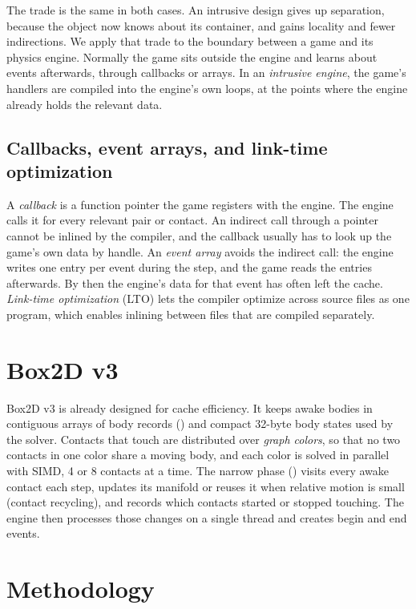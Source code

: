 \documentclass[11pt]{article}
\newcommand{\code}[1]{\texttt{\detokenize{#1}}}
\begin{document}
The trade is the same in both cases. An intrusive design gives up separation, because the object
now knows about its container, and gains locality and fewer indirections. We apply that trade to
the boundary between a game and its physics engine. Normally the game sits outside the engine and
learns about events afterwards, through callbacks or arrays. In an \emph{intrusive engine}, the
game's handlers are compiled into the engine's own loops, at the points where the engine already
holds the relevant data.

\subsection{Callbacks, event arrays, and link-time optimization}

A \emph{callback} is a function pointer the game registers with the engine. The engine calls it
for every relevant pair or contact. An indirect call through a pointer cannot be inlined by the
compiler, and the callback usually has to look up the game's own data by handle. An \emph{event
array} avoids the indirect call: the engine writes one entry per event during the step, and the
game reads the entries afterwards. By then the engine's data for that event has often left the
cache. \emph{Link-time optimization} (LTO) lets the compiler optimize across source files as one
program, which enables inlining between files that are compiled separately.

\section{Box2D v3}

Box2D v3 is already designed for cache efficiency. It keeps awake bodies in contiguous arrays of
body records (\code{b2BodySim}) and compact 32-byte body states used by the solver. Contacts that
touch are distributed over \emph{graph colors}, so that no two contacts in one color share a moving
body, and each color is solved in parallel with SIMD, 4 or 8 contacts at a time. The narrow phase
(\code{b2CollideTask}) visits every awake contact each step, updates its manifold or reuses it when
relative motion is small (contact recycling), and records which contacts started or stopped
touching. The engine then processes those changes on a single thread and creates begin and end
events.

\section{Methodology}
\label{sec:method}
\end{document}
